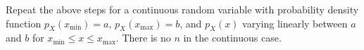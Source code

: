 \documentclass[letterpaper,12pt]{article}
\begin{document}
\begin{enumerate}
Repeat the above steps for a continuous random variable with probability density function $p_X(x_{\min}) = a$, $p_X(x_{\max}) = b$, and $p_X(x)$ varying linearly between $a$ and $b$ for $x_{\min} \leq x \leq x_{\max}$. There is no $n$ in the continuous case.




\end{enumerate}
\end{document}
